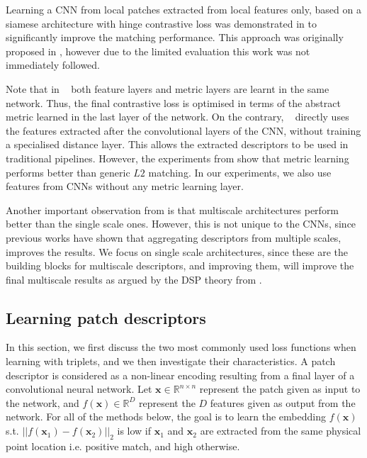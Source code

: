 Learning a CNN from local patches extracted from
local features only, based on a siamese architecture with hinge
contrastive loss \cite{1640964} was demonstrated in
\cite{ZagoruykoCVPR2015,simo2015deepdesc,Han_2015_CVPR} to significantly
 improve the matching performance. This approach was originally proposed in \cite{Jahrer}, however due to the limited evaluation this work was
not immediately followed.

Note that in ~\cite{ZagoruykoCVPR2015,Han_2015_CVPR} both feature
layers and metric layers are learnt in the same network. Thus, the
final contrastive loss is optimised in terms of the abstract metric
learned in the last layer of the network. On the contrary,
~\cite{simo2015deepdesc} directly uses the features extracted after
the convolutional layers of the CNN, without training a specialised
distance layer. This allows the extracted descriptors to be used in
traditional pipelines. However, the experiments from
\cite{ZagoruykoCVPR2015} show that metric learning performs better
than generic $L2$ matching. In our experiments, we also use features
from CNNs without any metric learning layer.

Another important observation from \cite{ZagoruykoCVPR2015} is that
multiscale architectures perform better than the single scale ones. However,
this is not unique to the CNNs, since previous works have
shown that aggregating descriptors from multiple scales, improves the
results.  We focus on single scale architectures,
since these are the building blocks for multiscale descriptors, and
improving them, will improve the final multiscale results as argued
by the DSP theory from \cite{DBLP:journals/corr/DongS14}.

\subsection{Learning patch descriptors}

In this section, we first discuss the two most commonly used loss functions when learning with triplets, and we then investigate their characteristics.  A patch descriptor is considered as  a non-linear encoding resulting from a final layer of a convolutional neural network. Let
$\boldsymbol x \in \mathbb{R}^{n \times n}$ represent the patch given
as input to the network, and $f(\boldsymbol x) \in \mathbb{R}^{D}$
represent the $D$ features given as output from the network.
For all of the methods below, the goal is to learn the embedding
$f(\boldsymbol x)$ s.t. $||f(\boldsymbol x_1) - f(\boldsymbol x_2)
||_2$ is low if $\boldsymbol x_1$ and $\boldsymbol x_2$ are extracted from the same physical point location i.e. positive match, and high otherwise.

